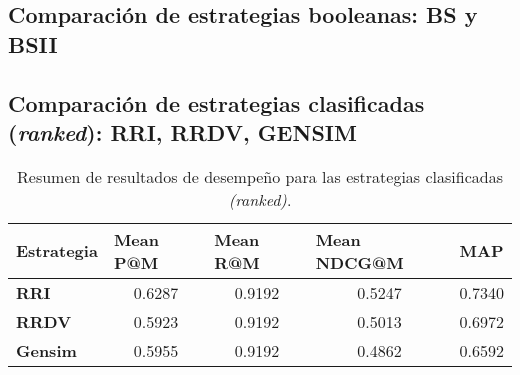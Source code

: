 \subsection{Comparación de estrategias booleanas: BS y BSII}


\subsection{Comparación de estrategias clasificadas (\textit{ranked}): RRI, RRDV, GENSIM }

\begin{table}[H]
\centering
\begin{tabular}{|l|c|c|c|c|}
\hline
\textbf{Estrategia} & \multicolumn{1}{l|}{\textbf{Mean P@M}} & \multicolumn{1}{l|}{\textbf{Mean R@M}} & \multicolumn{1}{l|}{\textbf{Mean NDCG@M}} & \multicolumn{1}{l|}{\textbf{MAP}} \\ \hline
\textbf{RRI} & 0.6287 & 0.9192 & 0.5247 & 0.7340 \\ \hline
\textbf{RRDV} & 0.5923 & 0.9192 & 0.5013 & 0.6972 \\ \hline
\textbf{Gensim} & 0.5955 & 0.9192 & 0.4862 & 0.6592 \\ \hline
\end{tabular}
\caption{Resumen de resultados de desempeño para las estrategias clasificadas \textit{(ranked)}.}
\label{tab:rankedResults}
\end{table}


